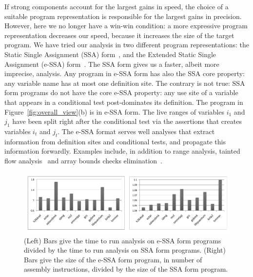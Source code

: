 \documentclass{llncs}
\begin{document}
If strong components account for the largest gains in speed, the choice of
a suitable program representation is responsible for the largest gains in
precision.
However, here we no longer have a win-win condition: a more expressive
program representation decreases our speed, because it increases the
size of the target program.
We have tried our analysis in two different program representations: the
Static Single Assignment (SSA) form~\cite{Cytron91}, and the Extended Static
Single Assignment (e-SSA) form~\cite{Bodik00}.
The SSA form gives us a faster, albeit more imprecise, analysis.
Any program in e-SSA form has also the SSA core property: any variable name
has at most one definition site.
The contrary is not true: SSA form programs do not have the core e-SSA
property: any use site of a variable that appears in a conditional test
post-dominates its definition.
The program in Figure~\ref{fig:overall_view}(b) is in e-SSA form.
The live ranges of variables $i_1$ and $j_1$ have been split right after the
conditional test via the assertions that creates variables $i_t$ and $j_t$.
The e-SSA format serves well analyses that extract information from definition
sites and conditional tests, and propagate this information forwardly.
Examples include, in addition to range analysis, tainted flow
analysis~\cite{Rimsa11} and array bounds checks elimination~\cite{Bodik00}.

\begin{figure}[t!]
\begin{center}
\includegraphics[width=1\textwidth]{images/impactESSA}
\end{center}
\caption{\label{fig:impactESSA}
(Left) Bars give the time to run analysis on e-SSA form programs divided by
the time to run analysis on SSA form programs.
(Right) Bars give the size of the e-SSA form program, in number of
assembly instructions, divided by the size of the SSA form program.}
\end{figure}
\end{document}
